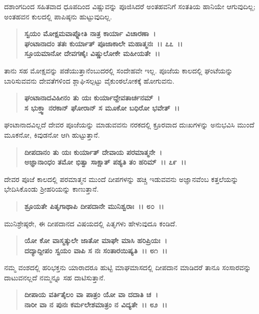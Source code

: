 ದಶಾಂಗದಿಂದ ಸಹಿತವಾದ ಧೂಪದಿಂದ ವಿಷ್ಣುವನ್ನು ಪೂಜಿಸಿದರೆ ಅಂತಹವನಿಗೆ ಸಂತತಿಯ ಹಾನಿಯೇ ಆಗುವುದಿಲ್ಲ; ಅಂತಹವನ ಕುಲದಲ್ಲಿ ಪಾಪಿಷ್ಠನು ಹುಟ್ಟುವುದಿಲ್ಲ.

\begin{verse}
\textbf{ಸ್ವಯಂ ಮೋಕ್ಷಮವಾಪ್ನೋತಿ ನಾತ್ರ ಕಾರ್ಯಾ ವಿಚಾರಣಾ~।}\\\textbf{ಘಂಟಾನಾದಂ ತತಃ ಕುರ್ಯಾತ್ ಪೂಜಾಕಾಲೇ ಮಹಾತ್ಮನಃ~।। ೭೭~।।}\\\textbf{ಸ್ತೂಯಮಾನೋ ದೇವಗಣೈಃ ವಿಷ್ಣುಲೋಕೇ ಮಹೀಯತೇ~।।}
\end{verse}

ತಾನು ಸಹ ಮೋಕ್ಷವನ್ನು ಪಡೆಯುತ್ತಾನೆಂಬುದರಲ್ಲಿ ಸಂದೇಹವೇ ಇಲ್ಲ. ಪೂಜೆಯ ಕಾಲದಲ್ಲಿ ಘಂಟೆಯನ್ನು ಬಾರಿಸುವವನು ದೇವತೆಗಳಿಂದ ಶ್ಲಾಘಿಸಲ್ಪಟ್ಟು ವೈಕುಂಠಲೋಕಕ್ಕೆ ಹೋಗುವನು.

\begin{verse}
\textbf{ಘಂಟಾನಾದವಿಹೀನಂ ತು ಯಃ ಕುರ್ಯಾದ್ದೇವತಾರ್ಚನಮ್~।}\\\textbf{ಸ ಭುಕ್ತ್ವಾ ನರಕಾನ್ ಘೋರಾನ್ ಸ ಮೂಕೋ ಬಧಿರೋ ಭವೇತ್~।।}
\end{verse}

ಘಂಟಾನಾದವಿಲ್ಲದೆ ದೇವರ ಪೂಜೆಯನ್ನು ಮಾಡುವವನು ನರಕದಲ್ಲಿ ಕ್ರೂರವಾದ ದುಃಖಗಳನ್ನು ಅನುಭವಿಸಿ ಮುಂದೆ ಮೂಕನೋ, ಕಿವುಡನೋ ಆಗಿ ಹುಟ್ಟುತ್ತಾನೆ.

\begin{verse}
\textbf{ದೀಪದಾನಂ ತು ಯಃ ಕುರ್ಯಾತ್ ದೇವಾಯ ಪರಮಾತ್ಮನೇ~।}\\\textbf{ಅಜ್ಞಾನಾಂಧಂ ತಮೋ ಭಿತ್ವಾ ಸಾಕ್ಷಾತ್ ಪಶ್ಯತಿ ತಂ ಹರಿಮ್~।। ೭೯~।।}
\end{verse}

ದೇವರ ಪೂಜೆ ಕಾಲದಲ್ಲಿ ಪರಮಾತ್ಮನ ಮುಂದೆ ದೀಪಗಳನ್ನು ಹಚ್ಚಿ ಇಡುವವನು ಅಜ್ಞಾನ\-ವೆಂಬ ಕತ್ತಲೆಯನ್ನು ಭೇದಿಸಿಕೊಂಡು ಶ‍್ರೀಹರಿಯನ್ನು ಕಾಣುತ್ತಾನೆ.

\begin{verse}
\textbf{ಶ್ರೂಯತೇ ಪಿತೃಗಾಥಾಪಿ ದೀಪದಾನೇ ಮುನಿಶ್ವರಾಃ~।। ೮೦~।।}
\end{verse}

ಮುನಿಶ್ರೇಷ್ಠರೇ, ಈ ದೀಪದಾನದ ವಿಷಯದಲ್ಲಿ ಪಿತೃಗಳು ಹೇಳುವುದೂ ಕಂಡಿದೆ.

\begin{verse}
\textbf{ಯೋ ಕೋ ವಾಸ್ಮತ್ಕುಲೇ ಜಾತೋ ಮಾಘೇ ಮಾಸಿ ಹರಿಪ್ರಿಯಃ~।}\\\textbf{ದದ್ಯಾದ್ದೀಪಂ ಸ್ವಯಂ ವಾಪಿ ಸ ನಃ ಸಂತಾರಯಿಷ್ಯತಿ~।। ೮೧~।।}
\end{verse}

ನಮ್ಮ ವಂಶದಲ್ಲಿ ಹರಿಭಕ್ತನು ಯಾರಾದರೂ ಹುಟ್ಟಿ ಮಾಘಮಾಸದಲ್ಲಿ ದೀಪದಾನ ಮಾಡಿದರೆ ತಾನೂ ಸಂಸಾರವನ್ನು ದಾಟುವನಲ್ಲದೆ ನಮ್ಮನ್ನೂ ಸಹ ದಾಟಿಸುತ್ತಾನೆ.

\begin{verse}
\textbf{ದೀಪಾಯ ವರ್ತಿತೈಲಂ ವಾ ಪಾತ್ರಂ ಯೋ ವಾ ದದಾತಿ ಚ~।}\\\textbf{ನಾರೀ ವಾ ನ ಪುನಃ ಕರ್ಮಲೇಶಮಾತ್ರಂ ನ ವಿದ್ಯತೇ~।। ೮೨~।।}
\end{verse}

